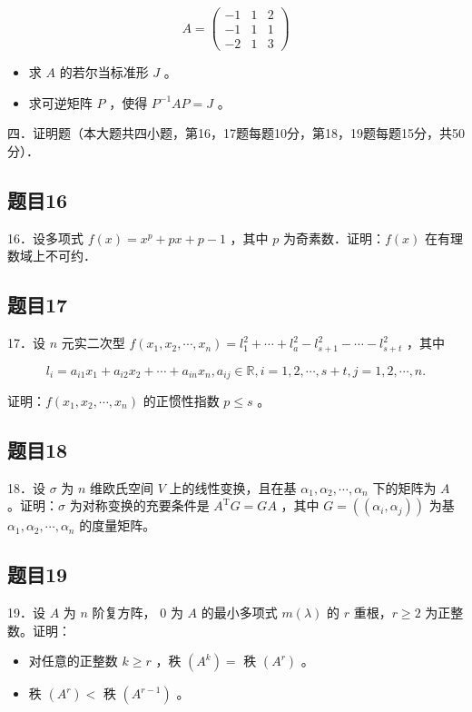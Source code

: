 \documentclass{article}
\begin{document}
\[
A=\left(\begin{array}{lll}
-1 & 1 & 2 \\
-1 & 1 & 1 \\
-2 & 1 & 3
\end{array}\right)
\]

\begin{itemize}
  \item[（1）] 求 \(A\) 的若尔当标准形 \(J\) 。
  \item[（2）] 求可逆矩阵 \(P\) ，使得 \(P^{-1} A P=J\) 。
\end{itemize}

四．证明题（本大题共四小题，第16，17题每题10分，第18，19题每题15分，共50分）．\\

\subsection{题目16}
16．设多项式 \(f(x)=x^{p}+p x+p-1\) ，其中 \(p\) 为奇素数．证明：\(f(x)\) 在有理数域上不可约．

\subsection{题目17}
17．设 \(n\) 元实二次型 \(f\left(x_{1}, x_{2}, \cdots, x_{n}\right)=l_{1}^{2}+\cdots+l_{a}^{2}-l_{s+1}^{2}-\cdots-l_{s+t}^{2}\) ，其中

\[
l_{i}=a_{i 1} x_{1}+a_{i 2} x_{2}+\cdots+a_{i n} x_{n}, a_{i j} \in \mathbb{R}, i=1,2, \cdots, s+t, j=1,2, \cdots, n .
\]

证明：\(f\left(x_{1}, x_{2}, \cdots, x_{n}\right)\) 的正惯性指数 \(p \leq s\) 。

\subsection{题目18}
18．设 \(\sigma\) 为 \(n\) 维欧氏空间 \(V\) 上的线性变换，且在基 \(\alpha_{1}, \alpha_{2}, \cdots, \alpha_{n}\) 下的矩阵为 \(A\) 。证明：\(\sigma\) 为对称变换的充要条件是 \(A^{\mathrm{T}} G=G A\) ，其中 \(G=\left(\left(\alpha_{i}, \alpha_{j}\right)\right)\) 为基 \(\alpha_{1}, \alpha_{2}, \cdots, \alpha_{n}\) 的度量矩阵。

\subsection{题目19}
19．设 \(A\) 为 \(n\) 阶复方阵， 0 为 \(A\) 的最小多项式 \(m(\lambda)\) 的 \(r\) 重根，\(r \geq 2\) 为正整数。证明：

\begin{itemize}
  \item[（1）] 对任意的正整数 \(k \geq r\) ，秩 \(\left(A^{k}\right)=\) 秩 \(\left(A^{r}\right)\) 。
  \item[（2）] 秩 \(\left(A^{r}\right)<\) 秩 \(\left(A^{r-1}\right)\) 。
\end{itemize}
\end{document}
